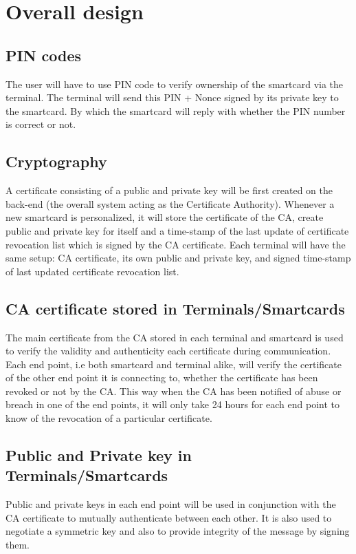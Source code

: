 \section{Overall design}
\subsection{PIN codes}
The user will have to use PIN code to verify ownership of the smartcard via the terminal. The terminal will send this PIN + Nonce signed by its private key to the smartcard. By which the smartcard will reply with whether the PIN number is correct or not.

\subsection{Cryptography}
A certificate consisting of a public and private key will be first created on the back-end (the overall system acting as the Certificate Authority). Whenever a new smartcard is personalized, it will store the certificate of the CA, create public and private key for itself and a time-stamp of the last update of certificate revocation list which is signed by the CA certificate. Each terminal will have the same setup: CA certificate, its own public and private key, and signed time-stamp of last updated certificate revocation list.

\subsection{CA certificate stored in Terminals/Smartcards}
The main certificate from the CA stored in each terminal and smartcard is used to verify the validity and authenticity each certificate during communication. Each end point, i.e both smartcard and terminal alike, will verify the certificate of the other end point it is connecting to, whether the certificate has been revoked or not by the CA. This way when the CA has been notified of abuse or breach in one of the end points, it will only take 24 hours for each end point to know of the revocation of a particular certificate.

\subsection{Public and Private key in Terminals/Smartcards}
Public and private keys in each end point will be used in conjunction with the CA certificate to mutually authenticate between each other. It is also used to negotiate a symmetric key and also to provide integrity of the message by signing them.

